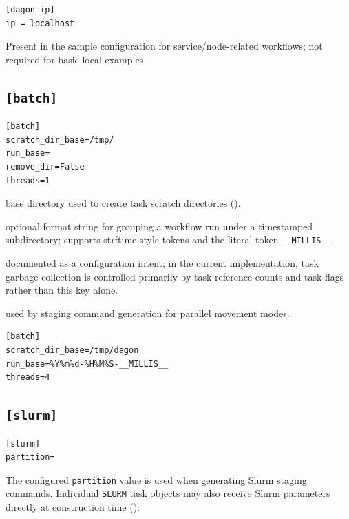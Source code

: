 \begin{lstlisting}[style=ini]
[dagon_ip]
ip = localhost
\end{lstlisting}

Present in the sample configuration for service/node-related workflows; not
required for basic local examples.

\subsection{\texttt{[batch]}}

\begin{lstlisting}[style=ini]
[batch]
scratch_dir_base=/tmp/
run_base=
remove_dir=False
threads=1
\end{lstlisting}

\begin{description}[leftmargin=2em, style=nextline]
  \item[\texttt{scratch\_dir\_base}] base directory used to create task
    scratch directories ().
  \item[\texttt{run\_base}] optional format string for grouping a workflow
    run under a timestamped subdirectory; supports strftime-style tokens and
    the literal token \texttt{\_\_MILLIS\_\_}.
  \item[\texttt{remove\_dir}] documented as a configuration intent; in the
    current implementation, task garbage collection is controlled primarily
    by task reference counts and task flags rather than this key alone.
  \item[\texttt{threads}] used by staging command generation for parallel
    movement modes.
\end{description}

\begin{lstlisting}[style=ini, caption={Grouping a run under a timestamped subdirectory.}]
[batch]
scratch_dir_base=/tmp/dagon
run_base=%Y%m%d-%H%M%S-__MILLIS__
threads=4
\end{lstlisting}

\subsection{\texttt{[slurm]}}

\begin{lstlisting}[style=ini]
[slurm]
partition=
\end{lstlisting}

The configured \texttt{partition} value is used when generating Slurm staging
commands. Individual \texttt{SLURM} task objects may also receive Slurm
parameters directly at construction time ():

